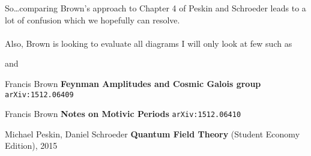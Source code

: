 \documentclass[12pt]{article}
\begin{document}
So\dots comparing Brown's approach to Chapter 4 of Peskin and Schroeder leads to a lot of confusion which we hopefully can resolve.  \\ \\Also, Brown is looking to evaluate all diagrams I will only look at few such as 
and
\selectfont \fontsize{12}{10}\selectfont

\begin{thebibliography}{}

\item Francis Brown \textbf{Feynman Amplitudes and Cosmic Galois group} \texttt{arXiv:1512.06409}

\item Francis Brown \textbf{Notes on Motivic Periods}
\texttt{arXiv:1512.06410}

\item Michael Peskin, Daniel Schroeder \textbf{Quantum Field Theory} (Student Economy Edition), 2015



\end{thebibliography}
\end{document}

